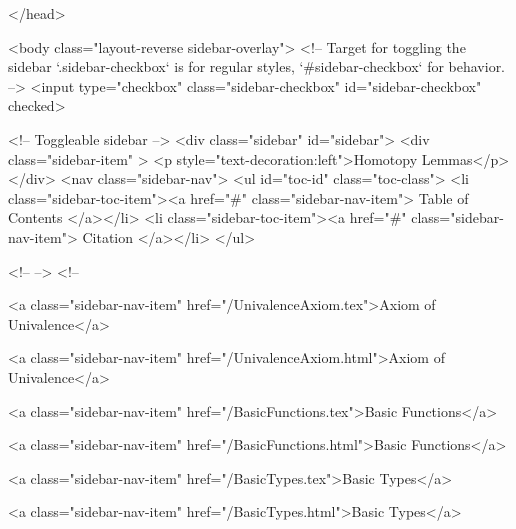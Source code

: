   
</head>




  <body class="layout-reverse sidebar-overlay">
    <!-- Target for toggling the sidebar `.sidebar-checkbox` is for regular
     styles, `#sidebar-checkbox` for behavior. -->
<input type="checkbox" class="sidebar-checkbox" id="sidebar-checkbox" checked>

<!-- Toggleable sidebar -->
<div class="sidebar" id="sidebar">
  <div class="sidebar-item" >
    <p style="text-decoration:left">Homotopy Lemmas</p>
  </div>
  <nav class="sidebar-nav">
    <ul id="toc-id" class="toc-class">
  <li class="sidebar-toc-item"><a href="#" class="sidebar-nav-item"> Table of Contents </a></li>
  <li class="sidebar-toc-item"><a href="#" class="sidebar-nav-item"> Citation </a></li>
</ul>


    <!--  -->
    <!-- 
      
    
      
    
      
    
      
    
      
        
      
    
      
        
          <a class="sidebar-nav-item" href="/UnivalenceAxiom.tex">Axiom of Univalence</a>
        
      
    
      
        
          <a class="sidebar-nav-item" href="/UnivalenceAxiom.html">Axiom of Univalence</a>
        
      
    
      
        
          <a class="sidebar-nav-item" href="/BasicFunctions.tex">Basic Functions</a>
        
      
    
      
        
          <a class="sidebar-nav-item" href="/BasicFunctions.html">Basic Functions</a>
        
      
    
      
        
          <a class="sidebar-nav-item" href="/BasicTypes.tex">Basic Types</a>
        
      
    
      
        
          <a class="sidebar-nav-item" href="/BasicTypes.html">Basic Types</a>
        
      
    
